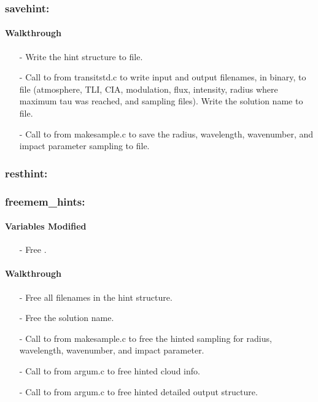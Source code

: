 \documentclass[letterpaper,12pt]{article}
\begin{document}
\subsubsection{savehint:}
\paragraph{Walkthrough}
\begin{enumerate}[leftmargin=10pt, noitemsep, parsep=0pt, topsep=0ex]
\item[-] Write the hint structure to file.
\item[-] Call to  from transitstd.c to write input and output filenames, in binary, to file (atmosphere, TLI, CIA, modulation, flux, intensity, radius where maximum tau was reached, and sampling files). Write the solution name to file.
\item[-] Call to  from makesample.c to save the radius, wavelength, wavenumber, and impact parameter sampling to file.
\end{enumerate}

\subsubsection{resthint:}

\subsubsection{freemem\_hints:}
\paragraph{Variables Modified}
\begin{enumerate}[leftmargin=10pt, noitemsep, parsep=0pt, topsep=0ex]
\item[-] Free .
\end{enumerate}

\paragraph{Walkthrough}
\begin{enumerate}[leftmargin=10pt, noitemsep, parsep=0pt, topsep=0ex]
\item[-] Free all filenames in the hint structure.
\item[-] Free the solution name.
\item[-] Call to  from makesample.c to free the hinted sampling for radius, wavelength, wavenumber, and impact parameter.
\item[-] Call to  from argum.c to free hinted cloud info.
\item[-] Call to  from argum.c to free hinted detailed output structure.
\end{enumerate}
\end{document}
